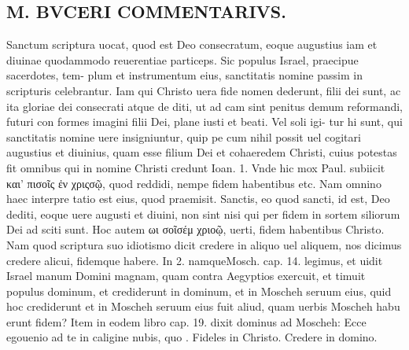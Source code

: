 \documentclass{article}
\begin{document}
\begin{pages}
\section*{M. BVCERI COMMENTARIVS.  }
\marginpar{[ p.19 ]}\pstart Sanctum scriptura uocat, quod est Deo consecratum, eoque augustius iam et diuinae quodammodo reuerentiae particeps.  Sic populus Israel, praecipue sacerdotes, tem- plum et instrumentum eius, sanctitatis nomine passim in scripturis celebrantur.  Iam qui Christo uera fide nomen dederunt, filii dei sunt, ac ita gloriae dei consecrati atque de diti, ut ad cam sint penitus demum reformandi, futuri con formes imagini filii Dei, plane iusti et beati.  Vel soli igi- tur hi sunt, qui sanctitatis nomine uere insigniuntur, quip pe cum nihil possit uel cogitari augustius et diuinius, quam esse filium Dei et cohaeredem Christi, cuius potestas fit omnibus qui in nomine Christi credunt Ioan. 1.  Vnde hic mox Paul.  subiicit και' πισοῖς ἐν χριςσῷ, quod reddidi, nempe fidem habentibus etc. Nam omnino haec interpre tatio est eius, quod praemisit. Sanctis, eo quod sancti, id est, Deo dediti, eoque uere augusti et diuini, non sint nisi qui per fidem in sortem siliorum Dei ad sciti sunt.  \pend\pstart Hoc autem ωι σοῖσέμ χριοῷ, uerti, fidem habentibus Christo.  Nam quod scriptura suo idiotismo dicit credere in aliquo uel aliquem, nos dicimus credere alicui, fidemque habere.  In 2.  namqueMosch.  cap. 14. legimus, et uidit Israel manum Domini magnam, quam contra Aegyptios exercuit, et timuit populus dominum, et crediderunt in dominum, et in Moscheh seruum eius, quid hoc crediderunt et in Moscheh seruum eius fuit aliud, quam uerbis Moscheh habu erunt fidem? Item in eodem libro cap. 19. dixit dominus ad Moscheh: Ecce egouenio ad te in caligine nubis, quo  \pendSancti. Fideles in Christo. Credere in domino. 

\end{pages}
\end{document}
